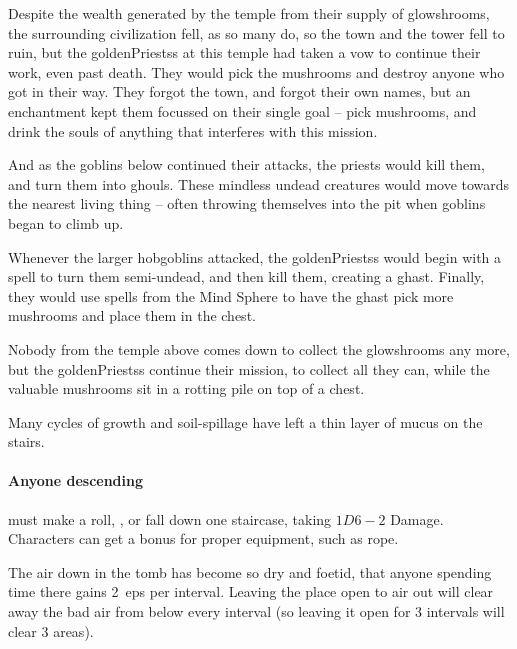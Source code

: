 \begin{multicols}{2}


\begin{exampletext}

  Despite the wealth generated by the temple from their supply of glowshrooms, the surrounding civilization fell, as so many do, so the town and the tower fell to ruin, but the \glspl{goldenPriests} at this temple had taken a vow to continue their work, even past death.
  They would pick the mushrooms and destroy anyone who got in their way.
  They forgot the town, and forgot their own names, but an enchantment kept them focussed on their single goal -- pick mushrooms, and drink the souls of anything that interferes with this mission.

  And as the goblins below continued their attacks, the priests would kill them, and turn them into ghouls.
  These mindless undead creatures would move towards the nearest living thing -- often throwing themselves into the pit when goblins began to climb up.

  Whenever the larger hobgoblins attacked, the \glspl{goldenPriests} would begin with a spell to turn them semi-undead, and then kill them, creating a ghast.%
  Finally, they would use spells from the Mind Sphere to have the ghast pick more mushrooms and place them in the chest.

  Nobody from the temple above comes down to collect the glowshrooms any more, but the \glspl{goldenPriests} continue their mission, to collect all they can, while the valuable mushrooms sit in a rotting pile on top of a chest.
\end{exampletext}

Many \glspl{cycle} of growth and soil-spillage have left a thin layer of mucus on the stairs.

\paragraph{Anyone descending}
must make a  roll, \tn[8], or fall down one staircase, taking $1D6-2$ Damage.
Characters can get a bonus for proper equipment, such as rope.

The air down in the tomb has become so dry and foetid, that anyone spending time there gains 2~\glspl{ep} per \gls{interval}.
Leaving the place open to air out will clear away the bad air from  below every \gls{interval} (so leaving it open for 3 \glspl{interval} will clear 3 \glspl{area}).


\end{multicols}
